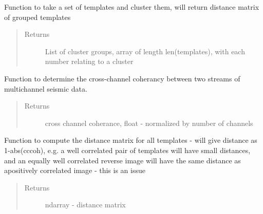 \documentclass[a4paper,10pt,english]{sphinxmanual}
\begin{document}

\begin{fulllineitems}
\label{utils:clustering.cluster}
Function to take a set of templates and cluster them, will return distance            matrix of grouped templates
\begin{quote}\begin{description}
\item[{Returns}] \leavevmode
List of cluster groups, array of length len(templates), with
each number relating to a cluster

\end{description}\end{quote}

\end{fulllineitems}


\begin{fulllineitems}
\label{utils:clustering.cross_chan_coherance}
Function to determine the cross-channel coherancy between two streams of
multichannel seismic data.
\begin{quote}\begin{description}
\item[{Returns}] \leavevmode
cross channel coherance, float - normalized by number of channels

\end{description}\end{quote}

\end{fulllineitems}


\begin{fulllineitems}
\label{utils:clustering.distance_matrix}
Function to compute the distance matrix for all templates - will give
distance as 1-abs(cccoh), e.g. a well correlated pair of templates will
have small distances, and an equally well correlated reverse image will
have the same distance as apositively correlated image - this is an issue
\begin{quote}\begin{description}
\item[{Returns}] \leavevmode
ndarray - distance matrix

\end{description}\end{quote}

\end{fulllineitems}
\end{document}
